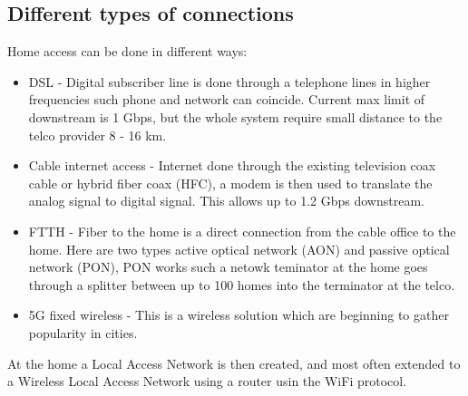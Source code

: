 \documentclass[12pt, a4paper]{article}
\begin{document}
		\subsection{Different types of connections}
			Home access can be done in different ways:
			\begin{itemize}
				\item DSL - Digital subscriber line is done through a telephone lines in higher frequencies such phone and network can coincide. Current max limit of downstream is 1 Gbps, but the whole system require small distance to the telco provider 8 - 16 km.
				\item Cable internet access - Internet done through the existing television coax cable or hybrid fiber coax (HFC), a modem is then used to translate the analog signal to digital signal. This allows up to 1.2 Gbps downstream. 
				\item FTTH - Fiber to the home is a direct connection from the cable office to the home. Here are two types active optical network (AON) and passive optical network (PON), PON works such a netowk teminator at the home goes through a splitter between up to 100 homes into the terminator at the telco.\\
				\item 5G fixed wireless - This is a wireless solution which are beginning to gather popularity in cities.
			\end{itemize}
			At the home a Local Access Network is then created, and most often extended to a Wireless Local Access Network using a router usin the WiFi protocol.
\end{document}
